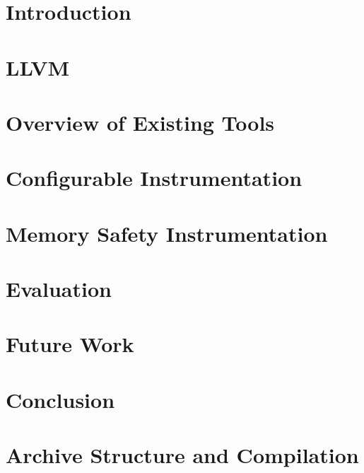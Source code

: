 \documentclass[
  digital, %
  notable,   %
  nolof,     %
  nolot,     %
  nocover
]{fithesis3}
\begin{document}
\chapter{Introduction}


\chapter{LLVM}\label{chap:llvm}


\chapter{Overview of Existing Tools}\label{chap:tools}


\chapter{Configurable Instrumentation}\label{chap:instr}


\chapter{Memory Safety Instrumentation}\label{chap:memsafety}


\chapter{Evaluation}\label{chap:eval}


\chapter{Future Work}\label{chap:future}


\chapter{Conclusion}\label{chap:conclusion}


\printbibliography

\appendix %
\chapter{Archive Structure and Compilation}

\end{document}

